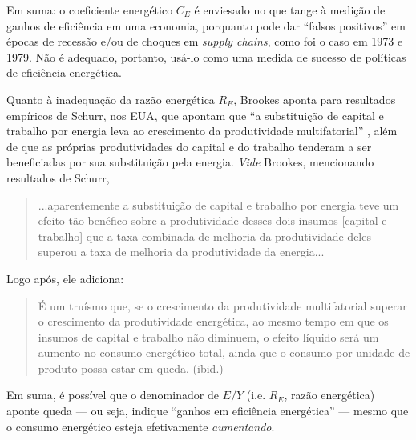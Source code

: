 Em suma: o coeficiente energético $C_E$ é enviesado no que tange à medição de ganhos de eficiência em uma economia, porquanto pode dar ``falsos positivos'' em épocas de recessão e/ou de choques em \textit{supply chains}, como foi o caso em 1973 e 1979. Não é adequado, portanto, usá-lo como uma medida de sucesso de políticas de eficiência energética.


Quanto à inadequação da razão energética $R_E$, Brookes aponta para resultados empíricos de Schurr, nos EUA, que apontam que ``a substituição de capital e trabalho por energia leva ao crescimento da produtividade multifatorial'' \parencite[p. 325]{Brookes1990}, além de que as próprias produtividades do capital e do trabalho tenderam a ser beneficiadas por sua substituição pela energia. \textit{Vide} Brookes, mencionando resultados de Schurr,
\begin{quote}
    ...aparentemente a substituição de capital e trabalho por energia teve um efeito tão benéfico sobre a produtividade desses dois insumos [capital e trabalho] que a taxa combinada de melhoria da produtividade deles superou a taxa de melhoria da produtividade da energia... \parencite[p. 325]{Brookes1990}
\end{quote}
Logo após, ele adiciona:
\begin{quote}
    É um truísmo que, se o crescimento da produtividade multifatorial superar o crescimento da produtividade energética, ao mesmo tempo em que os insumos de capital e trabalho não diminuem, o efeito líquido será um aumento no consumo energético total, ainda que o consumo por unidade de produto possa estar em queda. (ibid.)
\end{quote}
Em suma, é possível que o denominador de $E/Y$ (i.e. $R_E$, razão energética) aponte queda --- ou seja, indique ``ganhos em eficiência energética'' --- mesmo que o consumo energético esteja efetivamente \textit{aumentando}. 


